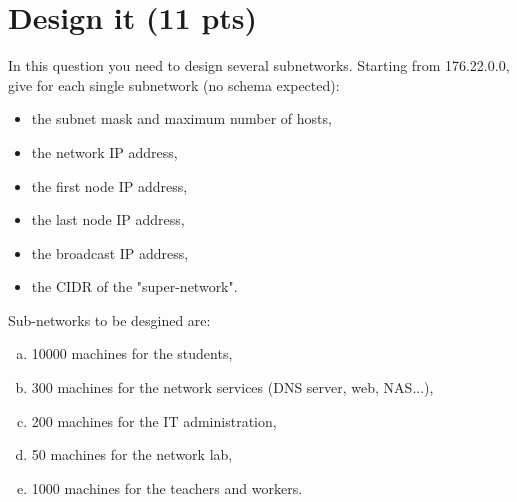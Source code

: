 \documentclass[11pt]{article}
\begin{document}
\section{Design it (11 pts)}\vspace{-11pt}
\begin{multicols}{2}
	In this question you need to design several subnetworks. Starting from 176.22.0.0, give for each single subnetwork (no schema expected):
	\begin{itemize}
		\item the subnet mask and maximum number of hosts,
		\item the network IP address,
		\item the first node IP address,
		\item the last node IP address,
		\item the broadcast IP address,
		\item the CIDR of the "super-network".
	\end{itemize}
\vspace{11pt}	Sub-networks to be desgined are:
	\begin{enumerate}[a.]
		\item 10000 machines for the students,
		\item 300 machines for the network services (DNS server, web, NAS...),
		\item 200 machines for the IT administration,
		\item 50 machines for the network lab,
		\item 1000 machines for the teachers and workers.
	\end{enumerate}

\end{multicols}
\end{document}
